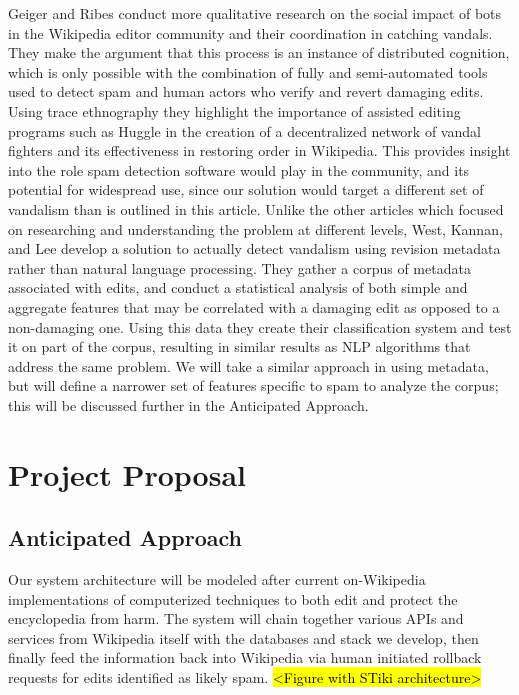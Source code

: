 \documentclass[letterpaper]{sig-alternate}
\begin{document}
Geiger and Ribes \cite{banning_of_a_vandal} conduct more qualitative research on the social impact of bots in the Wikipedia editor community and their coordination in catching vandals. They make the argument that this process is an instance of distributed cognition, which is only possible with the combination of fully and semi-automated tools used to detect spam and human actors who verify and revert damaging edits. Using trace ethnography they highlight the importance of assisted editing programs such as Huggle in the creation of a decentralized network of vandal fighters and its effectiveness in restoring order in Wikipedia. This provides insight into the role spam detection software would play in the community, and its potential for widespread use, since our solution would target a different set of vandalism than is outlined in this article.
Unlike the other articles which focused on researching and understanding the problem at different levels, West, Kannan, and Lee \cite{wiki_vandalism} develop a solution to actually detect vandalism using revision metadata rather than natural language processing. They gather a corpus of metadata associated with edits, and conduct a statistical analysis of both simple and aggregate features that may be correlated with a damaging edit as opposed to a non-damaging one. Using this data they create their classification system and test it on part of the corpus, resulting in similar results as NLP algorithms that address the same problem. We will take a similar approach in using metadata, but will define a narrower set of features specific to spam to analyze the corpus; this will be discussed further in the Anticipated Approach.

\section{Project Proposal}
\label{sec:project_proposal}

\subsection{Anticipated Approach}
\label{subsec:approach}
Our system architecture will be modeled after current on-Wikipedia implementations of computerized techniques to both edit and protect the encyclopedia from harm. The system will chain together various APIs and services from Wikipedia itself with the databases and stack we develop, then finally feed the information back into Wikipedia via human initiated rollback requests for edits identified as likely spam. \hl{<Figure with STiki architecture>}
\end{document}
